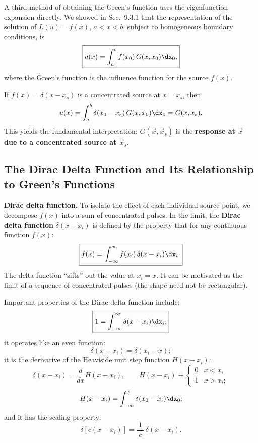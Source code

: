 A third method of obtaining the Green's function uses the eigenfunction expansion directly.  We showed in Sec.~9.3.1 that the representation of the solution of $L(u) = f(x)$, $a < x < b$, subject to homogeneous boundary conditions, is
\begin{equation}
\label{eq:9.3.10}
\boxed{u(x) = \int_a^b f(x_0)\,G(x,x_0)\dx_0,}
\end{equation}
where the Green's function is the influence function for the source $f(x)$.

If $f(x) = \delta(x-x_s)$ is a concentrated source at $x = x_s$, then
\[
u(x) = \int_a^b \delta(x_0 - x_s)\,G(x,x_0)\dx_0 = G(x,x_s).
\]
This yields the fundamental interpretation: $G(\vec{x},\vec{x}_s)$ is the \textbf{response at $\vec{x}$ due to a concentrated source at $\vec{x}_s$}.

\subsection{The Dirac Delta Function and Its Relationship to Green's Functions}
\label{sec:greens-dirac}

\textbf{Dirac delta function.}
To isolate the effect of each individual source point, we decompose $f(x)$ into a sum of concentrated pulses.  In the limit, the \textbf{Dirac delta function} $\delta(x - x_i)$ is defined by the property that for any continuous function $f(x)$:
\begin{equation}
\label{eq:9.3.11}
\boxed{f(x) = \int_{-\infty}^{\infty} f(x_i)\,\delta(x - x_i)\dx_i.}
\end{equation}
The delta function ``sifts'' out the value at $x_i = x$.  It can be motivated as the limit of a sequence of concentrated pulses (the shape need not be rectangular).

Important properties of the Dirac delta function include:
\begin{equation}
\label{eq:9.3.12}
\boxed{1 = \int_{-\infty}^{\infty}\delta(x - x_i)\dx_i;}
\end{equation}
it operates like an even function:
\begin{equation}
\label{eq:9.3.13}
\delta(x - x_i) = \delta(x_i - x);
\end{equation}
it is the derivative of the Heaviside unit step function $H(x-x_i)$:
\begin{equation}
\label{eq:9.3.14}
\delta(x-x_i) = \frac{d}{d x}H(x-x_i), \qquad H(x-x_i) \equiv \begin{cases} 0 & x < x_i \\ 1 & x > x_i; \end{cases}
\end{equation}
\begin{equation}
\label{eq:9.3.15}
H(x-x_i) = \int_{-\infty}^{x} \delta(x_0 - x_i)\dx_0;
\end{equation}
and it has the scaling property:
\begin{equation}
\label{eq:9.3.16}
\delta[c(x-x_i)] = \frac{1}{|c|}\,\delta(x-x_i).
\end{equation}

